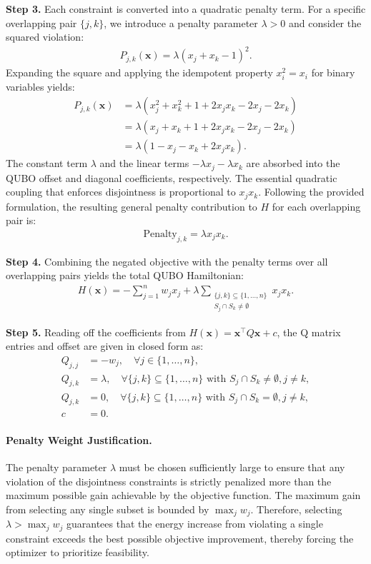 \documentclass[12pt]{article}
\begin{document}
\textbf{Step 3.} Each constraint is converted into a quadratic penalty term. For a specific overlapping pair $\{j,k\}$, we introduce a penalty parameter $\lambda > 0$ and consider the squared violation:
\begin{align}
P_{j,k}(\mathbf{x}) = \lambda (x_j + x_k - 1)^2.
\end{align}
Expanding the square and applying the idempotent property $x_i^2 = x_i$ for binary variables yields:
\begin{align}
P_{j,k}(\mathbf{x}) &= \lambda (x_j^2 + x_k^2 + 1 + 2x_j x_k - 2x_j - 2x_k) \\
&= \lambda (x_j + x_k + 1 + 2x_j x_k - 2x_j - 2x_k) \\
&= \lambda (1 - x_j - x_k + 2x_j x_k).
\end{align}
The constant term $\lambda$ and the linear terms $-\lambda x_j - \lambda x_k$ are absorbed into the QUBO offset and diagonal coefficients, respectively. The essential quadratic coupling that enforces disjointness is proportional to $x_j x_k$. Following the provided formulation, the resulting general penalty contribution to $H$ for each overlapping pair is:
\begin{align}
\text{Penalty}_{j,k} = \lambda x_j x_k.
\end{align}

\textbf{Step 4.} Combining the negated objective with the penalty terms over all overlapping pairs yields the total QUBO Hamiltonian:
\begin{align}
H(\mathbf{x}) = -\sum_{j=1}^{n} w_j x_j + \lambda \sum_{\substack{\{j,k\} \subseteq \{1,\dots,n\} \\ S_j \cap S_k \neq \emptyset}} x_j x_k.
\end{align}

\textbf{Step 5.} Reading off the coefficients from $H(\mathbf{x}) = \mathbf{x}^\top Q \mathbf{x} + c$, the Q matrix entries and offset are given in closed form as:
\begin{align}
Q_{j,j} &= -w_j, \quad \forall j \in \{1, \dots, n\}, \\
Q_{j,k} &= \lambda, \quad \forall \{j,k\} \subseteq \{1, \dots, n\} \text{ with } S_j \cap S_k \neq \emptyset, j \neq k, \\
Q_{j,k} &= 0, \quad \forall \{j,k\} \subseteq \{1, \dots, n\} \text{ with } S_j \cap S_k = \emptyset, j \neq k, \\
c &= 0.
\end{align}

\paragraph{Penalty Weight Justification.}
The penalty parameter $\lambda$ must be chosen sufficiently large to ensure that any violation of the disjointness constraints is strictly penalized more than the maximum possible gain achievable by the objective function. The maximum gain from selecting any single subset is bounded by $\max_{j} w_j$. Therefore, selecting $\lambda > \max_{j} w_j$ guarantees that the energy increase from violating a single constraint exceeds the best possible objective improvement, thereby forcing the optimizer to prioritize feasibility.
\end{document}
